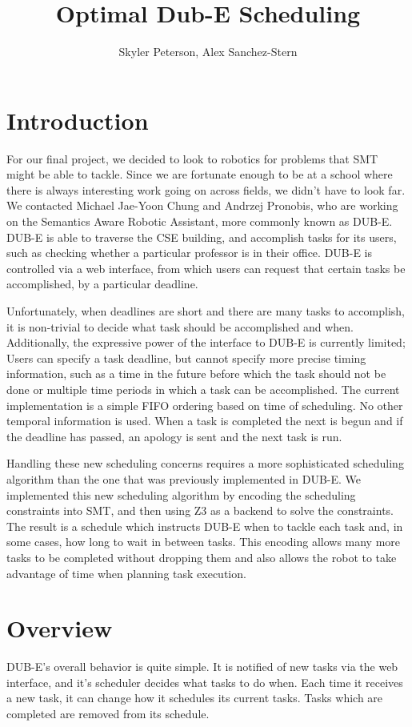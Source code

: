\documentclass{article}
\title{Optimal Dub-E Scheduling}
\author{Skyler Peterson, Alex Sanchez-Stern}
\begin{document}
\maketitle
\section{Introduction}
For our final project,
we decided to look to robotics
for problems that SMT might be able to tackle.
Since we are fortunate enough to be at a school
where there is always interesting work going on across fields,
we didn't have to look far.
We contacted Michael Jae-Yoon Chung and Andrzej Pronobis,
who are working on the Semantics Aware Robotic Assistant,
more commonly known as DUB-E.
DUB-E is able to traverse the CSE building,
and accomplish tasks for its users,
such as checking whether a particular professor is in their office.
DUB-E is controlled via a web interface,
from which users can request that certain tasks be accomplished,
by a particular deadline.

Unfortunately, when deadlines are short
and there are many tasks to accomplish,
it is non-trivial to decide what task
should be accomplished and when.
Additionally, the expressive power of the interface to DUB-E
is currently limited;
Users can specify a task deadline,
but cannot specify more precise timing information,
such as a time in the future
before which the task should not be done
or multiple time periods in which a task can be accomplished.
The current implementation is a simple FIFO ordering based on
time of scheduling. No other temporal information is
used. When a task is completed the next is begun and if the
deadline has passed, an apology is sent and the next task
is run.

Handling these new scheduling concerns
requires a more sophisticated scheduling algorithm
than the one that was previously implemented in DUB-E.
We implemented this new scheduling algorithm
by encoding the scheduling constraints into SMT,
and then using Z3 as a backend
to solve the constraints.
The result is a schedule which instructs DUB-E
when to tackle each task and,
in some cases,
how long to wait in between tasks.
This encoding allows many more tasks to be
completed without dropping them and also
allows the robot to take advantage of time
when planning task execution.


\section{Overview}
DUB-E's overall behavior is quite simple.
It is notified of new tasks via the web interface,
and it's scheduler decides what tasks to do when.
Each time it receives a new task,
it can change how it schedules its current tasks.
Tasks which are completed are removed from its schedule.
\end{document}
